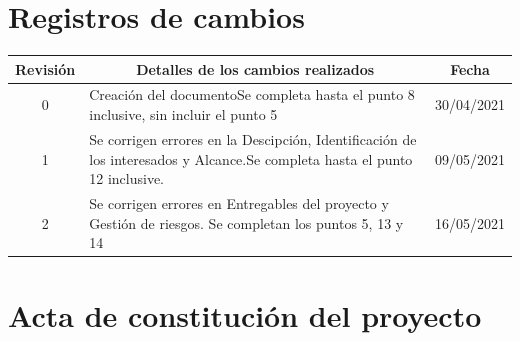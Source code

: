 \documentclass[
11pt, %
codirector, %
]{charter}
\begin{document}
\maketitle
\thispagestyle{empty}
\pagebreak


\thispagestyle{empty}
{\setlength{\parskip}{0pt}
\tableofcontents{}
}
\pagebreak


\section{Registros de cambios}
\label{sec:registro}


\begin{table}[ht]
\label{tab:registro}
\centering
\begin{tabularx}{\linewidth}{@{}|c|X|c|@{}}
\hline
\rowcolor[HTML]{C0C0C0} 
Revisión & \multicolumn{1}{c|}{\cellcolor[HTML]{C0C0C0}Detalles de los cambios realizados} & Fecha      \\ \hline
0      & Creación del documento\newline Se completa hasta el punto 8 inclusive, sin incluir el punto 5 &30/04/2021 \\ \hline
1      & Se corrigen errores en la Descipción, Identificación de los interesados y Alcance.\newline Se completa hasta el punto 12 inclusive.                  & 09/05/2021 \\ \hline
2      & Se corrigen errores en Entregables del proyecto y Gestión de riesgos. \newline
Se completan los puntos 5, 13 y 14					& 16/05/2021 \\ \hline
\end{tabularx}
\end{table}

\pagebreak



\section{Acta de constitución del proyecto}
\label{sec:acta}
\end{document}
